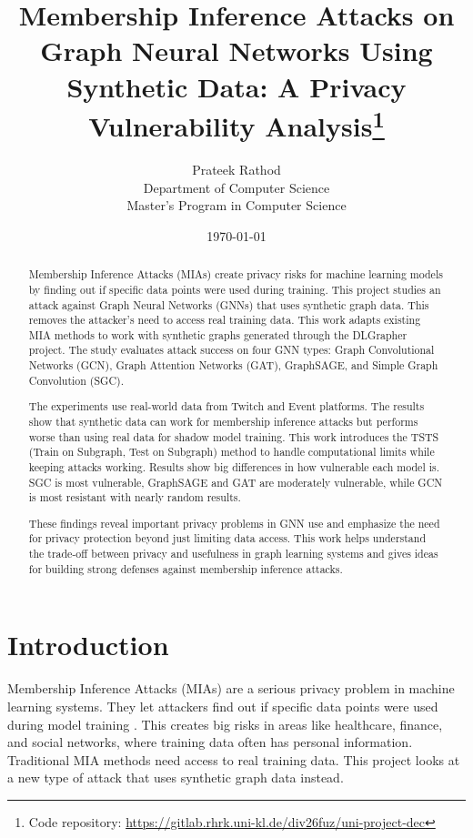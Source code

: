 \documentclass{article}
\title{Membership Inference Attacks on Graph Neural Networks Using Synthetic Data: A Privacy Vulnerability Analysis\footnote{Code repository: \url{https://gitlab.rhrk.uni-kl.de/div26fuz/uni-project-dec}}}
\author{Prateek Rathod\\
Department of Computer Science\\
Master's Program in Computer Science}
\date{\today}
\begin{document}
\maketitle

\begin{abstract}
Membership Inference Attacks (MIAs) create privacy risks for machine learning models by finding out if specific data points were used during training. This project studies an attack against Graph Neural Networks (GNNs) that uses synthetic graph data. This removes the attacker's need to access real training data. This work adapts existing MIA methods to work with synthetic graphs generated through the DLGrapher project\cite{dlgrapher2022}. The study evaluates attack success on four GNN types: Graph Convolutional Networks (GCN), Graph Attention Networks (GAT), GraphSAGE, and Simple Graph Convolution (SGC). 

The experiments use real-world data from Twitch and Event platforms. The results show that synthetic data can work for membership inference attacks but performs worse than using real data for shadow model training. This work introduces the TSTS (Train on Subgraph, Test on Subgraph) method to handle computational limits while keeping attacks working. Results show big differences in how vulnerable each model is. SGC is most vulnerable, GraphSAGE and GAT are moderately vulnerable, while GCN is most resistant with nearly random results. 

These findings reveal important privacy problems in GNN use and emphasize the need for privacy protection beyond just limiting data access. This work helps understand the trade-off between privacy and usefulness in graph learning systems and gives ideas for building strong defenses against membership inference attacks.
\end{abstract}

\tableofcontents
\newpage

\section{Introduction}
Membership Inference Attacks (MIAs) are a serious privacy problem in machine learning systems. They let attackers find out if specific data points were used during model training \cite{shokri2017membership}. This creates big risks in areas like healthcare, finance, and social networks, where training data often has personal information. Traditional MIA methods need access to real training data. This project looks at a new type of attack that uses synthetic graph data instead.
\end{document}
